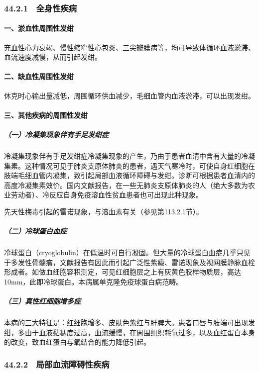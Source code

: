 \subsubsection{44.2.1　全身性疾病}

\paragraph{一、淤血性周围性发绀}

充血性心力衰竭、慢性缩窄性心包炎、三尖瓣膜病等，均可导致体循环血液淤滞、血流速度减慢，从而引起发绀。

\paragraph{二、缺血性周围性发绀}

休克时心输出量减低，周围循环供血减少，毛细血管内血液淤滞，可以出现发绀。

\paragraph{三、其他疾病的周围性发绀}

\subparagraph{（一）冷凝集现象伴有手足发绀症}

冷凝集现象伴有手足发绀症冷凝集现象的产生，乃由于患者血清中含有大量的冷凝集素。这种情况可见于肺炎支原体肺炎的患者，遇天气寒冷时，可使自身红细胞在肢端毛细血管内凝集，致引起局部血液循环障碍与发绀。诊断可根据患者血清内的高度冷凝集素效价。国内文献报告，在一些无肺炎支原体肺炎的人（绝大多数为农业劳动者）、冷反应自身免疫溶血性贫血患者也可出现此种现象。

先天性梅毒引起的雷诺现象，与溶血素有关（参见第113.2.1节）。

\subparagraph{（二）冷球蛋白血症}

冷球蛋白（cryoglobulin）在低温时可自行凝固。但大量的冷球蛋白血症几乎只见于多发性骨髓瘤，文献报告有因此而引起广泛性紫癜、雷诺现象及视网膜静脉血栓形成者。如做血细胞容积测定，可见红细胞层之上有灰黄色胶样物质层，高达10mm，此即冷球蛋白。本病属单克隆免疫球蛋白病范畴。

\subparagraph{（三）真性红细胞增多症}

本病的三大特征是：红细胞增多、皮肤色紫红与肝脾大。患者口唇与肢端可出现发绀，多由于血液黏稠度过高，血流缓慢，在周围组织耗氧过多，以及血红蛋白本身的改变，致血红蛋白与氧结合的能力降低引起。

\subsubsection{44.2.2　局部血流障碍性疾病}

